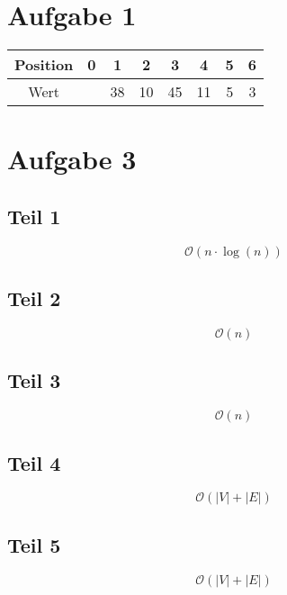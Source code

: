\documentclass[10pt,a4paper]{article}
\begin{document}
\section{Aufgabe 1}

\begin{tabular}{c|c|c|c|c|c|c|c}
  Position & 0 & 1 & 2 & 3 & 4 & 5 & 6\\\hline
  Wert     &  & 38 & 10 & 45 & 11 & 5 & 3
\end{tabular}

\section{Aufgabe 3}

\subsection{Teil 1}

\begin{equation}
  \mathcal{O}(n \cdot \log(n))
\end{equation}

\subsection{Teil 2}

\begin{equation}
  \mathcal{O}(n)
\end{equation}

\subsection{Teil 3}

\begin{equation}
  \mathcal{O}(n)
\end{equation}

\subsection{Teil 4}

\begin{equation}
  \mathcal{O}(|V| + |E|)
\end{equation}

\subsection{Teil 5}

\begin{equation}
  \mathcal{O}(|V| + |E|)
\end{equation}
\end{document}
